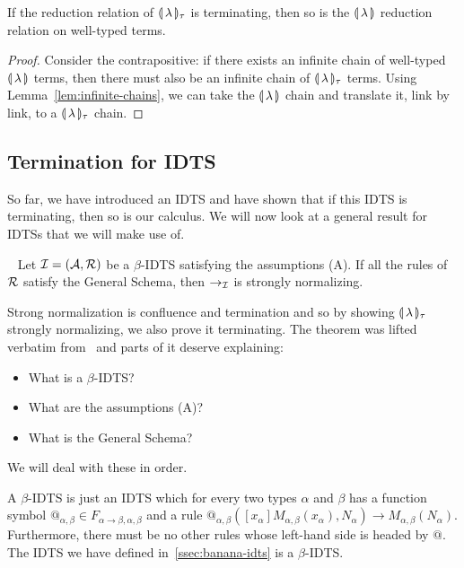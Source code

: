 \begin{corollary}
  If the reduction relation of $\llparenthesis \, \lambda \, \rrparenthesis_\tau$ is terminating, then
  so is the $\llparenthesis \, \lambda \, \rrparenthesis$ reduction relation on well-typed terms.
\end{corollary}

\begin{proof}
  Consider the contrapositive: if there exists an infinite chain of
  well-typed $\llparenthesis \, \lambda \, \rrparenthesis$ terms, then there must also be an infinite
  chain of $\llparenthesis \, \lambda \, \rrparenthesis_\tau$ terms. Using
  Lemma~\ref{lem:infinite-chains}, we can take the $\llparenthesis \, \lambda \, \rrparenthesis$ chain
  and translate it, link by link, to a $\llparenthesis \, \lambda \, \rrparenthesis_\tau$ chain.
\end{proof}


\subsection{Termination for IDTS}

So far, we have introduced an IDTS and have shown that if this IDTS is
terminating, then so is our calculus. We will now look at a general result
for IDTSs that we will make use of.

\begin{theorem}
  \label{thm:idts-normalization}
  ~\cite{blanqui2000termination} Let
  $\mathcal{I} = (\mathcal{A}, \mathcal{R})$ be a $\beta$-IDTS satisfying the assumptions (A). If
  all the rules of $\mathcal{R}$ satisfy the General Schema, then $\to_{\mathcal{I}}$ is
  strongly normalizing.
\end{theorem}

Strong normalization is confluence and termination and so by showing
$\llparenthesis \, \lambda \, \rrparenthesis_\tau$ strongly normalizing, we also prove it
terminating. The theorem was lifted verbatim
from~\cite{blanqui2000termination} and parts of it deserve explaining:

\begin{itemize}
\item What is a $\beta$-IDTS?
\item What are the assumptions (A)?
\item What is the General Schema?
\end{itemize}

We will deal with these in order.

A $\beta$-IDTS is just an IDTS which for every two types $\alpha$ and
$\beta$ has a function symbol
$@_{\alpha,\beta} \in F_{\alpha \to \beta,\alpha,\beta}$ and a rule
$@_{\alpha,\beta}([x_\alpha] M_{\alpha, \beta}(x_\alpha), N_\alpha) \to
M_{\alpha,\beta}(N_\alpha)$. Furthermore, there must be no other rules
whose left-hand side is headed by $@$. The IDTS we have defined
in~\ref{ssec:banana-idts} is a $\beta$-IDTS.

